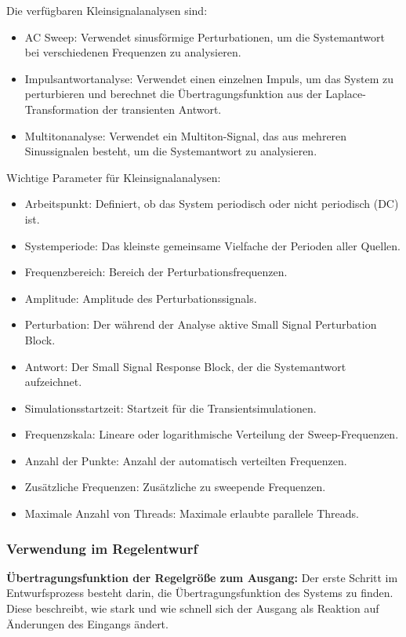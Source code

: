 \documentclass[a4paper,11pt,oneside]{article}
\begin{document}
Die verfügbaren Kleinsignalanalysen sind:
\begin{itemize}
	\item AC Sweep: Verwendet sinusförmige Perturbationen, um die Systemantwort bei verschiedenen Frequenzen zu analysieren.
	\item Impulsantwortanalyse: Verwendet einen einzelnen Impuls, um das System zu perturbieren und berechnet die Übertragungsfunktion aus der Laplace-Transformation der transienten Antwort.
	\item Multitonanalyse: Verwendet ein Multiton-Signal, das aus mehreren Sinussignalen besteht, um die Systemantwort zu analysieren.
\end{itemize}

Wichtige Parameter für Kleinsignalanalysen:
\begin{itemize}
	\item Arbeitspunkt: Definiert, ob das System periodisch oder nicht periodisch (DC) ist.
	\item Systemperiode: Das kleinste gemeinsame Vielfache der Perioden aller Quellen.
	\item Frequenzbereich: Bereich der Perturbationsfrequenzen.
	\item Amplitude: Amplitude des Perturbationssignals.
	\item Perturbation: Der während der Analyse aktive Small Signal Perturbation Block.
	\item Antwort: Der Small Signal Response Block, der die Systemantwort aufzeichnet.
	\item Simulationsstartzeit: Startzeit für die Transientsimulationen.
	\item Frequenzskala: Lineare oder logarithmische Verteilung der Sweep-Frequenzen.
	\item Anzahl der Punkte: Anzahl der automatisch verteilten Frequenzen.
	\item Zusätzliche Frequenzen: Zusätzliche zu sweepende Frequenzen.
	\item Maximale Anzahl von Threads: Maximale erlaubte parallele Threads.
\end{itemize}	
	
	\subsubsection{Verwendung im Regelentwurf}
	\textbf{Übertragungsfunktion der Regelgröße zum Ausgang:}
	Der erste Schritt im Entwurfsprozess besteht darin, die Übertragungsfunktion des Systems zu finden. Diese beschreibt, wie stark und wie schnell sich der Ausgang als Reaktion auf Änderungen des Eingangs ändert.
	
\end{document}
